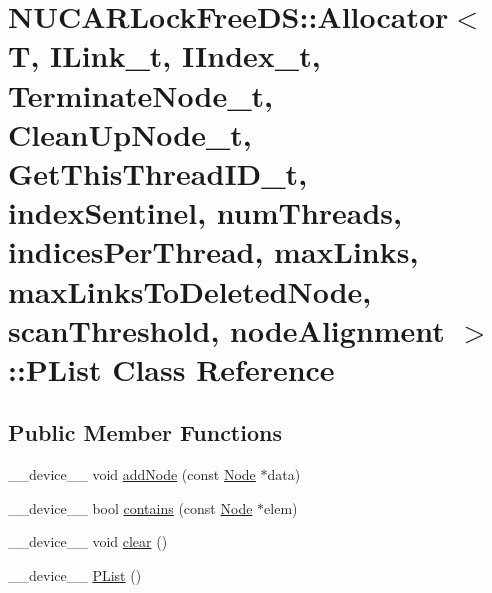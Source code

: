 \hypertarget{class_n_u_c_a_r_lock_free_d_s_1_1_allocator_1_1_p_list}{}\section{N\+U\+C\+A\+R\+Lock\+Free\+DS\+:\+:Allocator$<$ T, I\+Link\+\_\+t, I\+Index\+\_\+t, Terminate\+Node\+\_\+t, Clean\+Up\+Node\+\_\+t, Get\+This\+Thread\+I\+D\+\_\+t, index\+Sentinel, num\+Threads, indices\+Per\+Thread, max\+Links, max\+Links\+To\+Deleted\+Node, scan\+Threshold, node\+Alignment $>$\+:\+:P\+List Class Reference}
\label{class_n_u_c_a_r_lock_free_d_s_1_1_allocator_1_1_p_list}
\subsection*{Public Member Functions}
\begin{DoxyCompactItemize}
\item 
\+\_\+\+\_\+device\+\_\+\+\_\+ void \mbox{\hyperlink{class_n_u_c_a_r_lock_free_d_s_1_1_allocator_1_1_p_list_a62645ee0694885ea2d460db3c34c84ae}{add\+Node}} (const \mbox{\hyperlink{class_n_u_c_a_r_lock_free_d_s_1_1_allocator_1_1_node}{Node}} $\ast$data)
\item 
\+\_\+\+\_\+device\+\_\+\+\_\+ bool \mbox{\hyperlink{class_n_u_c_a_r_lock_free_d_s_1_1_allocator_1_1_p_list_a7131962e802f28f5bf5220211c7f5eb8}{contains}} (const \mbox{\hyperlink{class_n_u_c_a_r_lock_free_d_s_1_1_allocator_1_1_node}{Node}} $\ast$elem)
\item 
\+\_\+\+\_\+device\+\_\+\+\_\+ void \mbox{\hyperlink{class_n_u_c_a_r_lock_free_d_s_1_1_allocator_1_1_p_list_a05e00c2ca0f24298e7db21563368a416}{clear}} ()
\item 
\+\_\+\+\_\+device\+\_\+\+\_\+ \mbox{\hyperlink{class_n_u_c_a_r_lock_free_d_s_1_1_allocator_1_1_p_list_afd02db15ba9865760bb8c0649c1897a7}{P\+List}} ()
\end{DoxyCompactItemize}
